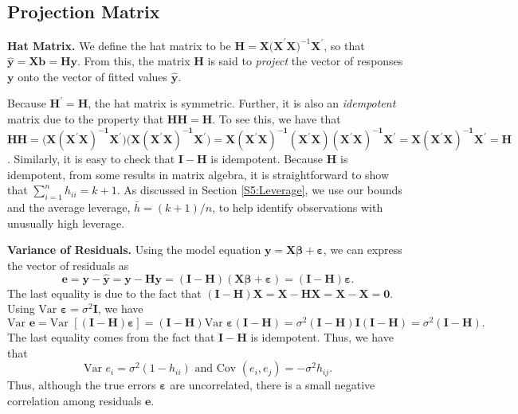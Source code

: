 \subsection{Projection Matrix}\label{S5:ProjMatrix}

\textbf{Hat Matrix.} We define the hat matrix to be $\mathbf{H} =
\mathbf{X(X}^{\prime}\mathbf{X)}^{-1} \mathbf{X}^{\prime}$, so that
$\mathbf{\hat{y}} = \mathbf{X b} =\mathbf{Hy}$. From this, the
matrix $\mathbf{H}$ is said to \textit{project} the vector of
responses $ \mathbf{y}$ onto the vector of fitted values
$\mathbf{\hat{y}}$.


Because $\mathbf{H}^{\prime}=\mathbf{H}$, the hat matrix is
symmetric. Further, it is also an \textit{idempotent} matrix due to
the property that $\mathbf{HH}=\mathbf{H}$. To see this, we have
that
$\mathbf{HH}=\mathbf{(X(\mathbf{X}^{\prime}X)}^{\mathbf{-1}}\mathbf{X}^{\prime}\mathbf{)(X(\mathbf{
X}^{\prime}X)}^{\mathbf{-1}}\mathbf{X}^{\prime}\mathbf{)}=\mathbf{X(
\mathbf{X}^{\prime}X)}^{\mathbf{-1}}\mathbf{(\mathbf{X}^{\prime}X)(\mathbf{X}^{\prime}X)}^{\mathbf{-1}}
\mathbf{X}^{\prime}=\mathbf{X(\mathbf{X}
^{\prime}X)}^{\mathbf{-1}}\mathbf{X}^{\prime}=\mathbf{H}$.
Similarly, it is easy to check that $\mathbf{I-H}$ is idempotent.
Because \textbf{H} is idempotent, from some results in matrix
algebra, it is straightforward to show that
$\sum_{i=1}^{n}h_{ii}=k+1$. As discussed in Section
\ref{S5:Leverage}, we use our bounds and the average leverage,
$\bar{h}=(k+1)/n$, to help identify observations with unusually high
leverage.

\textbf{Variance of Residuals.} Using the model equation
$\mathbf{y}=\mathbf{X} \boldsymbol \beta + \boldsymbol \varepsilon$,
we can express the vector of residuals as
\begin{equation}\label{E5:Residuals}
\mathbf{e} = \mathbf{y} - \mathbf{\hat{y}} =
\mathbf{y-Hy}=\mathbf{(I-H)(X \boldsymbol \beta +\boldsymbol
\varepsilon)}=\mathbf{(I-H) \boldsymbol \varepsilon}.
\end{equation}
The last equality is due to the fact that
$\mathbf{(I-H)X}=\mathbf{X-HX}= \mathbf{X-X}=\mathbf{0}$. Using
$\text{Var~} \boldsymbol \varepsilon = \sigma ^2 \mathbf{I}$, we
have
\begin{equation*}
\text{Var }\mathbf{e}=\text{Var }\left[ \mathbf{(I-H)\boldsymbol \varepsilon}\right] =%
\mathbf{(I-H)}\text{Var }\boldsymbol \varepsilon \mathbf{(I-H)}=\sigma ^2\mathbf{(I-H)I(I-H)}%
=\sigma ^2\mathbf{(I-H)}.
\end{equation*}
The last equality comes from the fact that $\mathbf{I-H}$ is
idempotent. Thus, we have that
\begin{equation}\label{E5:VarResiduals}
\text{Var }e_i=\sigma ^2(1-h_{ii})\text{ \ and \ Cov }%
(e_i,e_j)=-\sigma ^2h_{ij}.
\end{equation}
Thus, although the true errors $\boldsymbol \varepsilon$ are
uncorrelated, there is a small negative correlation among residuals
$\mathbf e$.

